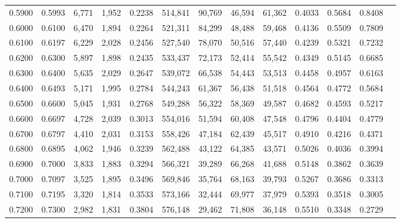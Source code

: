 \begin{tabular}{rrrrrrrrrrrrr}
0.5900 & 0.5993 &  6,771 & 1,952 &                                     0.2238 & 514,841 &  90,769 &  46,594 &  61,362 & 0.4033 & 0.5684 & 0.8408 \\
0.6000 & 0.6100 &  6,470 & 1,894 &                                     0.2264 & 521,311 &  84,299 &  48,488 &  59,468 & 0.4136 & 0.5509 & 0.7809 \\
0.6100 & 0.6197 &  6,229 & 2,028 &                                     0.2456 & 527,540 &  78,070 &  50,516 &  57,440 & 0.4239 & 0.5321 & 0.7232 \\
0.6200 & 0.6300 &  5,897 & 1,898 &                                     0.2435 & 533,437 &  72,173 &  52,414 &  55,542 & 0.4349 & 0.5145 & 0.6685 \\
0.6300 & 0.6400 &  5,635 & 2,029 &                                     0.2647 & 539,072 &  66,538 &  54,443 &  53,513 & 0.4458 & 0.4957 & 0.6163 \\
0.6400 & 0.6493 &  5,171 & 1,995 &                                     0.2784 & 544,243 &  61,367 &  56,438 &  51,518 & 0.4564 & 0.4772 & 0.5684 \\
0.6500 & 0.6600 &  5,045 & 1,931 &                                     0.2768 & 549,288 &  56,322 &  58,369 &  49,587 & 0.4682 & 0.4593 & 0.5217 \\
0.6600 & 0.6697 &  4,728 & 2,039 &                                     0.3013 & 554,016 &  51,594 &  60,408 &  47,548 & 0.4796 & 0.4404 & 0.4779 \\
0.6700 & 0.6797 &  4,410 & 2,031 &                                     0.3153 & 558,426 &  47,184 &  62,439 &  45,517 & 0.4910 & 0.4216 & 0.4371 \\
0.6800 & 0.6895 &  4,062 & 1,946 &                                     0.3239 & 562,488 &  43,122 &  64,385 &  43,571 & 0.5026 & 0.4036 & 0.3994 \\
0.6900 & 0.7000 &  3,833 & 1,883 &                                     0.3294 & 566,321 &  39,289 &  66,268 &  41,688 & 0.5148 & 0.3862 & 0.3639 \\
0.7000 & 0.7097 &  3,525 & 1,895 &                                     0.3496 & 569,846 &  35,764 &  68,163 &  39,793 & 0.5267 & 0.3686 & 0.3313 \\
0.7100 & 0.7195 &  3,320 & 1,814 &                                     0.3533 & 573,166 &  32,444 &  69,977 &  37,979 & 0.5393 & 0.3518 & 0.3005 \\
0.7200 & 0.7300 &  2,982 & 1,831 &                                     0.3804 & 576,148 &  29,462 &  71,808 &  36,148 & 0.5510 & 0.3348 & 0.2729 \\

\end{tabular}
